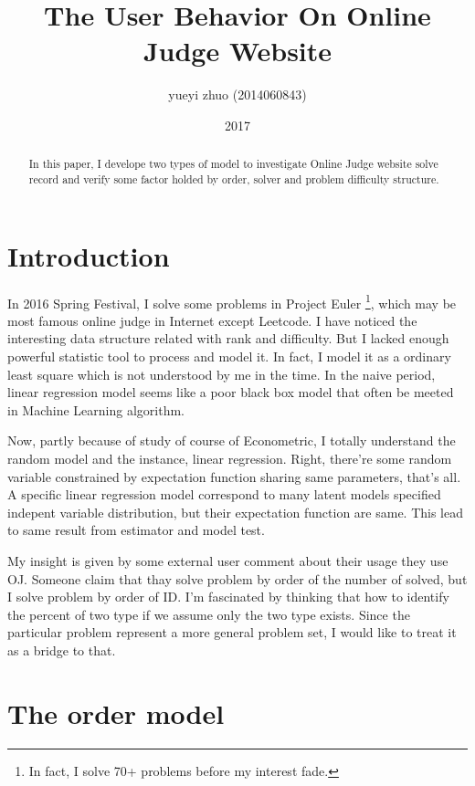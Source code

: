 \documentclass{article}
\title{The User Behavior On Online Judge Website}
\author{yueyi zhuo (2014060843)}
\date{2017}
\begin{document}
\maketitle

\begin{abstract}

In this paper, I develope two types of model to investigate Online Judge website solve record 
and verify some factor holded by order, solver and problem difficulty structure.

\end{abstract}

\section{Introduction}

In 2016 Spring Festival, I solve some problems in Project Euler 
\footnote{In fact, I solve 70+ problems before my interest fade.}, 
which may be most famous online judge 
in Internet except Leetcode. I have noticed the interesting data structure related with rank and difficulty.
But I lacked enough powerful statistic tool to process and model it. 
In fact, I model it as a ordinary least square which is not understood by me in the time. In the naive period,
linear regression model seems like a poor black box model that often be meeted in Machine Learning algorithm.

Now, partly because of study of course of Econometric, I totally understand the random model and the instance,
linear regression. 
Right, there're some random variable constrained by expectation function sharing same parameters, that's all.
A specific linear regression model correspond to many latent models specified indepent variable distribution,
but their expectation function are same. This lead to same result from estimator and model test.

My insight is given by some external user comment about their usage they use OJ. 
Someone claim that thay solve problem by order of the number of solved, but I solve problem by order of ID.
I'm fascinated by thinking that how to identify the percent of two type if we assume only the two type exists.
Since the particular problem represent a more general problem set, I would like to treat it as a bridge to that.

\section{The order model}
\end{document}
